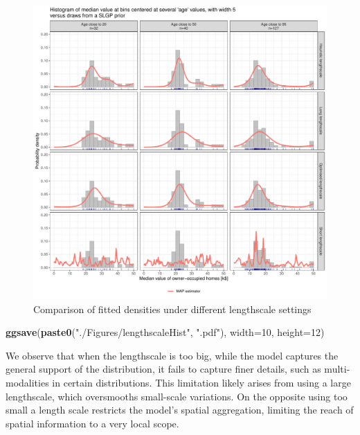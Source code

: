 \documentclass[
]{article}
\newenvironment{Shaded}{\begin{snugshade}}{\end{snugshade}}
\newcommand{\AttributeTok}[1]{\textcolor[rgb]{0.13,0.29,0.53}{#1}}
\newcommand{\DecValTok}[1]{\textcolor[rgb]{0.00,0.00,0.81}{#1}}
\newcommand{\FunctionTok}[1]{\textcolor[rgb]{0.13,0.29,0.53}{\textbf{#1}}}
\newcommand{\NormalTok}[1]{#1}
\newcommand{\StringTok}[1]{\textcolor[rgb]{0.31,0.60,0.02}{#1}}
\begin{document}
\begin{figure}[H]

{\centering \includegraphics{IntroductionSLGP_files/figure-latex/plotRibbonsLen2-1} 

}

\caption{Comparison of fitted densities under different lengthscale settings}\label{fig:plotRibbonsLen2}
\end{figure}

\begin{Shaded}
\begin{Highlighting}[]
\FunctionTok{ggsave}\NormalTok{(}\FunctionTok{paste0}\NormalTok{(}\StringTok{"./Figures/lengthscaleHist"}\NormalTok{,  }\StringTok{".pdf"}\NormalTok{), }\AttributeTok{width=}\DecValTok{10}\NormalTok{, }\AttributeTok{height=}\DecValTok{12}\NormalTok{)}
\end{Highlighting}
\end{Shaded}

We observe that when the lengthscale is too big, while the model captures the general support of the distribution, it fails to capture finer details, such as multi-modalities in certain distributions. This limitation likely arises from using a large lengthscale, which oversmooths small-scale variations.
On the opposite using too small a length scale restricts the model's spatial aggregation, limiting the reach of spatial information to a very local scope.
\end{document}

